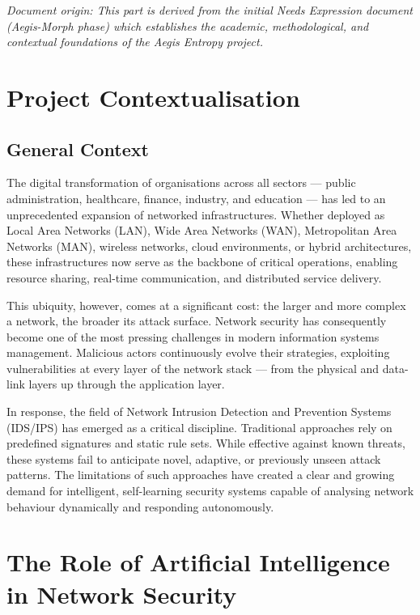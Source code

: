 \documentclass[12pt,a4paper]{report}
\begin{document}
\textit{Document origin: This part is derived from the initial Needs Expression document
(Aegis-Morph phase) which establishes the academic, methodological, and contextual
foundations of the Aegis Entropy project.}

\chapter{Project Contextualisation}

\section{General Context}

The digital transformation of organisations across all sectors --- public administration,
healthcare, finance, industry, and education --- has led to an unprecedented expansion of
networked infrastructures. Whether deployed as Local Area Networks (LAN), Wide Area
Networks (WAN), Metropolitan Area Networks (MAN), wireless networks, cloud environments,
or hybrid architectures, these infrastructures now serve as the backbone of critical operations,
enabling resource sharing, real-time communication, and distributed service delivery.

This ubiquity, however, comes at a significant cost: the larger and more complex a network,
the broader its attack surface. Network security has consequently become one of the most
pressing challenges in modern information systems management. Malicious actors continuously
evolve their strategies, exploiting vulnerabilities at every layer of the network stack --- from the
physical and data-link layers up through the application layer.

In response, the field of Network Intrusion Detection and Prevention Systems (IDS/IPS) has
emerged as a critical discipline. Traditional approaches rely on predefined signatures and static
rule sets. While effective against known threats, these systems fail to anticipate novel,
adaptive, or previously unseen attack patterns. The limitations of such approaches have
created a clear and growing demand for intelligent, self-learning security systems capable of
analysing network behaviour dynamically and responding autonomously.

\chapter{The Role of Artificial Intelligence in Network Security}
\end{document}
